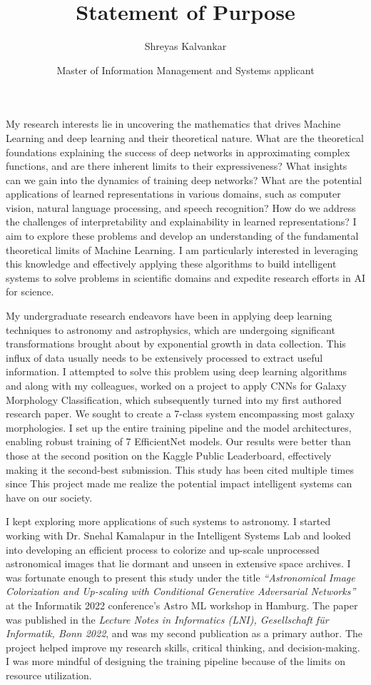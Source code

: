 \documentclass[11pt]{article}
\title{Statement of Purpose}
\author{Shreyas Kalvankar}
\date{Master of Information Management and Systems applicant}
\begin{document}
  \maketitle%
  \thispagestyle{empty}
  \vspace{16pt}

My research interests lie in uncovering the mathematics that drives Machine
Learning and deep learning and their theoretical nature. What are the
theoretical foundations explaining the success of deep networks in approximating
complex functions, and are there inherent limits to their expressiveness? What
insights can we gain into the dynamics of training deep networks? What are the
potential applications of learned representations in various domains, such as
computer vision, natural language processing, and speech recognition? How do we
address the challenges of interpretability and explainability in learned
representations? I aim to explore these problems and develop an understanding of
the fundamental theoretical limits of Machine Learning. I am particularly
interested in leveraging this knowledge and effectively applying these
algorithms to build intelligent systems to solve problems in scientific domains
and expedite research efforts in AI for science.

My undergraduate research endeavors have been in applying deep learning
techniques to astronomy and astrophysics, which are undergoing significant
transformations brought about by exponential growth in data collection. This
influx of data usually needs to be extensively processed to extract useful
information. I attempted to solve this problem using deep learning algorithms
and along with my colleagues, worked on a project to apply CNNs for Galaxy
Morphology Classification, which subsequently turned into my first authored
research paper. We sought to create a 7-class system encompassing most galaxy
morphologies. I set up the entire training pipeline and the model architectures,
enabling robust training of 7 EfficientNet models. Our results were better than
those at the second position on the Kaggle Public Leaderboard, effectively
making it the second-best submission. This study has been cited multiple times
since This project made me realize the potential impact intelligent systems can
have on our society. 

I kept exploring more applications of such systems to astronomy. I started
working with Dr. Snehal Kamalapur in the Intelligent Systems Lab and looked into
developing an efficient process to colorize and up-scale unprocessed
astronomical images that lie dormant and unseen in extensive space archives. I
was fortunate enough to present this study under the title \textit{“Astronomical
Image Colorization and Up-scaling with Conditional Generative Adversarial
Networks”}  at the Informatik 2022 conference’s Astro ML workshop in Hamburg.
The paper was published in the \textit{Lecture Notes in Informatics (LNI),
Gesellschaft für Informatik, Bonn 2022}, and was my second publication as a
primary author. The project helped improve my research skills, critical
thinking, and decision-making. I was more mindful of designing the training
pipeline because of the limits on resource utilization.
\end{document}

